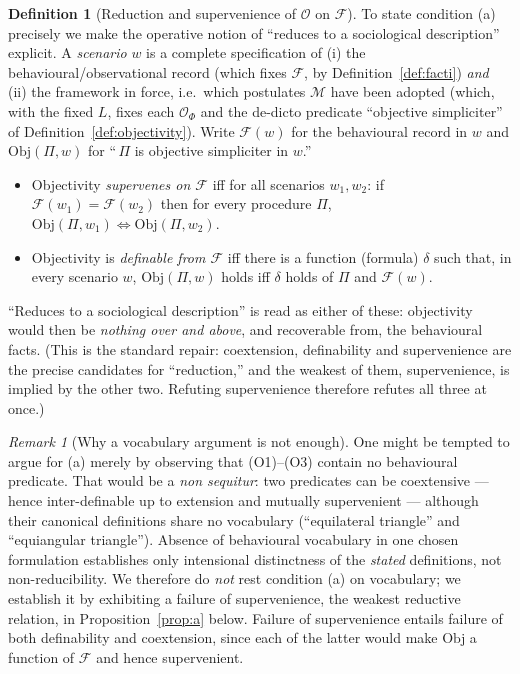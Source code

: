 \documentclass{amsart}
\theoremstyle{definition}
\newtheorem{definition}{Definition}
\theoremstyle{plain}
\theoremstyle{remark}
\newtheorem{remark}{Remark}
\begin{document}
\begin{definition}[Reduction and supervenience of $\mathcal{O}$ on
$\mathcal{F}$]\label{def:reduction}
To state condition (a) precisely we make the operative notion of ``reduces to a
sociological description'' explicit. A \emph{scenario} $w$ is a complete
specification of (i) the behavioural\slash observational record (which fixes
$\mathcal{F}$, by Definition~\ref{def:facti}) \emph{and} (ii) the framework in
force, i.e.\ which postulates $\mathcal{M}$ have been adopted (which, with the
fixed $L$, fixes each $\mathcal{O}_\Phi$ and the de-dicto predicate
``objective simpliciter'' of Definition~\ref{def:objectivity}). Write
$\mathcal{F}(w)$ for the behavioural record in $w$ and $\mathrm{Obj}(\Pi,w)$ for
``\,$\Pi$ is objective simpliciter in $w$.''
\begin{itemize}
\item Objectivity \emph{supervenes on $\mathcal{F}$} iff for all scenarios
$w_1,w_2$: if $\mathcal{F}(w_1)=\mathcal{F}(w_2)$ then for every procedure $\Pi$,
$\mathrm{Obj}(\Pi,w_1)\Leftrightarrow\mathrm{Obj}(\Pi,w_2)$.
\item Objectivity is \emph{definable from $\mathcal{F}$} iff there is a function
(formula) $\delta$ such that, in every scenario $w$, $\mathrm{Obj}(\Pi,w)$ holds
iff $\delta$ holds of $\Pi$ and $\mathcal{F}(w)$.
\end{itemize}
``Reduces to a sociological description'' is read as either of these:
objectivity would then be \emph{nothing over and above}, and recoverable from,
the behavioural facts. (This is the standard repair: coextension, definability
and supervenience are the precise candidates for ``reduction,'' and the weakest
of them, supervenience, is implied by the other two. Refuting supervenience
therefore refutes all three at once.)
\end{definition}

\begin{remark}[Why a vocabulary argument is not enough]\label{rem:vocab}
One might be tempted to argue for (a) merely by observing that (O1)--(O3)
contain no behavioural predicate. That would be a \emph{non sequitur}:
two predicates can be coextensive --- hence inter-definable up to extension and
mutually supervenient --- although their canonical definitions share no
vocabulary (``equilateral triangle'' and ``equiangular triangle''). Absence of
behavioural vocabulary in one chosen formulation establishes only intensional
distinctness of the \emph{stated} definitions, not non-reducibility. We
therefore do \emph{not} rest condition (a) on vocabulary; we establish it by
exhibiting a failure of supervenience, the weakest reductive relation, in
Proposition~\ref{prop:a} below. Failure of supervenience entails failure of
both definability and coextension, since each of the latter would make
$\mathrm{Obj}$ a function of $\mathcal{F}$ and hence supervenient.
\end{remark}
\end{document}
